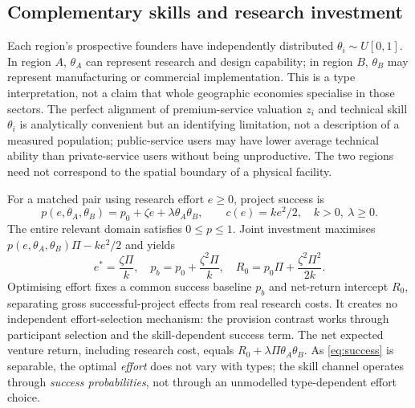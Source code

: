 \subsection{Complementary skills and research investment}
Each region's prospective founders have independently distributed $\theta_i\sim U[0,1]$. In region $A$, $\theta_A$ can represent research and design capability; in region $B$, $\theta_B$ may represent manufacturing or commercial implementation. This is a type interpretation, not a claim that whole geographic economies specialise in those sectors. The perfect alignment of premium-service valuation $z_i$ and technical skill $\theta_i$ is analytically convenient but an identifying limitation, not a description of a measured population; public-service users may have lower average technical ability than private-service users without being unproductive. The two regions need not correspond to the spatial boundary of a physical facility.

For a matched pair using research effort $e\geq0$, project success is
\begin{equation}
 p(e,\theta_A,\theta_B)=p_0+\zeta e+\lambda\theta_A\theta_B,\qquad
 c(e)=ke^2/2,\quad k>0,\ \lambda\geq0.
 \label{eq:success}
\end{equation}
The entire relevant domain satisfies $0\leq p\leq1$. Joint investment maximises $p(e,\theta_A,\theta_B)\Pi-ke^2/2$ and yields
\begin{equation}
 e^*=\frac{\zeta\Pi}{k},\quad
 p_b=p_0+\frac{\zeta^2\Pi}{k},\quad
 R_0=p_0\Pi+\frac{\zeta^2\Pi^2}{2k}.
 \label{eq:effort}
\end{equation}
Optimising effort fixes a common success baseline $p_b$ and net-return intercept $R_0$, separating gross successful-project effects from real research costs.
It creates no independent effort-selection mechanism: the provision contrast works through participant selection and the skill-dependent success term.
The net expected venture return, including research cost, equals
$R_0+\lambda\Pi\theta_A\theta_B$. As \eqref{eq:success} is separable, the optimal \emph{effort} does not vary with types; the skill channel operates through \emph{success probabilities}, not through an unmodelled type-dependent effort choice.

